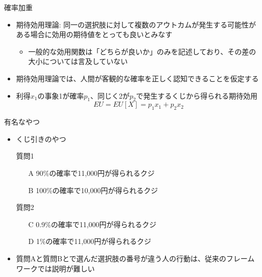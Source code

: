 \documentclass[dvipdfmx,11pt]{beamer}
\begin{document}
\begin{frame}{確率加重}
  \begin{itemize}
    \item 期待効用理論: 同一の選択肢に対して複数のアウトカムが発生する可能性がある場合に効用の期待値をとっても良いとみなす
    \begin{itemize}
      \item 一般的な効用関数は「どちらが良いか」のみを記述しており、その差の大小については言及していない
    \end{itemize}
    \item 期待効用理論では、人間が客観的な確率を正しく認知できることを仮定する
    \item 利得$x_1$の事象1が確率$p_1$、同じく2が$p_2$で発生するくじから得られる期待効用
    \[EU = EU[X] = p_1 x_1 + p_2 x_2\]
  \end{itemize}
\end{frame}

\begin{frame}{有名なやつ}
  \begin{itemize}
    \item くじ引きのやつ
    \begin{itembox}[l]{質問1}
      \begin{enumerate}
        \item[A] 90\%の確率で11,000円が得られるクジ
        \item[B] 100\%の確率で10,000円が得られるクジ
      \end{enumerate}
    \end{itembox}
    \begin{itembox}[l]{質問2}
      \begin{enumerate}
        \item[C] 0.9\%の確率で11,000円が得られるクジ
        \item[D] 1\%の確率で11,000円が得られるクジ
      \end{enumerate}
    \end{itembox}
    \item 質問Aと質問Bとで選んだ選択肢の番号が違う人の行動は、従来のフレームワークでは説明が難しい
  \end{itemize}
\end{frame}
\end{document}
